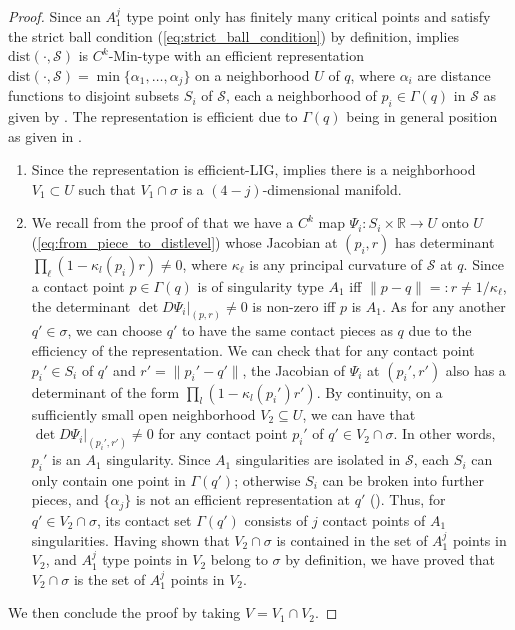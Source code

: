 \documentclass[11pt]{article}
\newcommand{\R}{\mathbb{R}}
\newcommand{\dist}{\mathrm{dist}}
\newcommand{\Surf}{\mathcal{S}}
\theoremstyle{plain}
\theoremstyle{definition}
\theoremstyle{remark}
\begin{document}
\begin{proof} 
Since an $A_1^j$ type point only has finitely many critical points and satisfy the strict ball condition (\cref{eq:strict_ball_condition}) by definition,  implies $\dist(\cdot, \Surf)$ is $C^k$-Min-type with an efficient representation $\dist(\cdot, \Surf) = \min \{ \alpha_1, \ldots, \alpha_j \}$ on a neighborhood $U$ of $q$, where $\alpha_i$ are distance functions to disjoint subsets $S_i$ of $\Surf$, each a neighborhood of $p_i \in \Gamma(q)$ in $\Surf$ as given by . The representation is efficient due to $\Gamma(q)$ being in general position as given in .
\begin{enumerate}
	\item  Since the representation is efficient-LIG,  implies there is a neighborhood $V_1 \subset U$ such that $V_1 \cap \sigma$ is a $(4-j)$-dimensional manifold.
	\item We recall from the proof of  that we have a $C^k$ map $\Psi_i: S_i \times \R \to U$ onto $U$ (\cref{eq:from_piece_to_distlevel}) whose Jacobian at $(p_i, r)$ has determinant $\prod_\ell (1-\kappa_l(p_i)r) \neq 0$, where $\kappa_\ell$ is any principal curvature of $\Surf$ at $q$. Since a contact point $p \in \Gamma(q)$ is of singularity type $A_1$ iff $\| p-q \| =: r \neq 1/\kappa_\ell$, the determinant $\det D\Psi_i \rvert_{(p, r)} \neq 0$ is non-zero iff $p$ is $A_1$. As for any another $q' \in \sigma$, we can choose $q'$ to have the same contact pieces as $q$ due to the efficiency of the representation.
 We can check that for any contact point $p_i' \in S_i$ of $q'$ and $r' = \| p_i' -q' \|$, the Jacobian of $\Psi_i$ at $(p_i', r')$ also has a determinant of the form $\prod_l (1-\kappa_l(p_i')r')$. By continuity, on a sufficiently small open neighborhood $V_2 \subseteq U$, we can have that $\det D \Psi_i \rvert_{(p_i', r')} \neq 0$ for any contact point $p_i'$ of $q' \in V_2 
	\cap \sigma$. In other words, $p_i'$ is an $A_1$ singularity. Since $A_1$ singularities are isolated in $\Surf$, each $S_i$ can only contain one point in $\Gamma(q')$; otherwise $S_i$ can be broken into further pieces, and  $\{ \alpha_j \}$ is not an efficient representation at $q'$ (). Thus, for $q' \in V_2 \cap \sigma$, its contact set $\Gamma(q')$ consists of $j$ contact points of $A_1$ singularities. Having shown that $V_2 \cap \sigma$ is contained in the set of $A_1^j$ points in $V_2$, and $A_1^j$ type points in $V_2$ belong to $\sigma$ by definition, we have proved that $V_2 \cap \sigma$ is the set of $A_1^j$ points in $V_2$. 
\end{enumerate}
We then conclude the proof by taking $V = V_1 \cap V_2$.
\end{proof}
\end{document}

